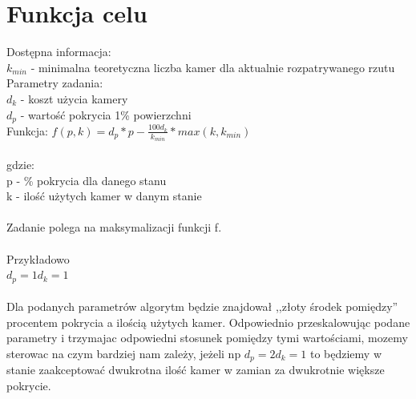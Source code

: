 \documentclass[12pt,a4paper]{article}
\begin{document}
\section{Funkcja celu}
Dostępna informacja: \\
\footnotesize
$k_{min}$ - minimalna teoretyczna liczba kamer dla aktualnie rozpatrywanego rzutu \\
\normalsize
%
\newline
Parametry zadania: \\
$d_k$ - koszt użycia kamery \\
$d_p$ - wartość pokrycia 1\% powierzchni\\
\newline
Funkcja:
$f(p, k) = d_p*p - \frac{100d_k}{k_{min}}*max(k,k_{min}) $ \\ \\
gdzie: \\
p - \% pokrycia dla danego stanu \\
k - ilość użytych kamer w danym stanie \\ \\
Zadanie polega na maksymalizacji funkcji f. \\ \\ 
Przykładowo \\
$ d_p = 1 d_k = 1$ \\ \\ 
Dla podanych parametrów algorytm będzie znajdował ,,złoty środek pomiędzy'' 
procentem pokrycia a ilością użytych kamer.
Odpowiednio przeskalowując podane parametry i trzymajac odpowiedni 
stosunek pomiędzy tymi wartościami,
mozemy sterowac na czym bardziej nam zależy, jeżeli np 
$d_p = 2d_k = 1 $ to będziemy w stanie zaakceptować dwukrotna 
ilość kamer w zamian za dwukrotnie większe pokrycie.
%
\end{document}
